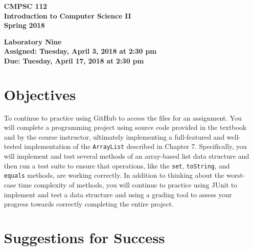 \documentclass[11pt]{article}
\newcommand{\assignmentduedate}{April 17}
\newcommand{\assignmentassignedate}{April 3}
\newcommand{\assignmentnumber}{Nine}
\newcommand{\labyear}{2018}
\newcommand{\labday}{Tuesday}
\newcommand{\labtime}{2:30 pm}
\newcommand{\assigneddate}{Assigned: \labday, \assignmentassignedate, \labyear{} at \labtime{}}
\newcommand{\duedate}{Due: \labday, \assignmentduedate, \labyear{} at \labtime{}}
\newcommand{\program}[1]{\lstinline{#1}}
\newcommand{\labtitle}[1]
{
  \begin{center}
    \begin{center}
      \bf
      CMPSC 112\\Introduction to Computer Science II\\
      Spring 2018\\
      \medskip
    \end{center}
    \bf
    #1
  \end{center}
}
\begin{document}
\thispagestyle{empty}

\labtitle{Laboratory \assignmentnumber{} \\ \assigneddate{} \\ \duedate{}}

\section*{Objectives}

To continue to practice using GitHub to access the files for an assignment. You
will complete a programming project using source code provided in the textbook
and by the course instructor, ultimately implementing a full-featured and
well-tested implementation of the \program{ArrayList} described in Chapter 7.
Specifically, you will implement and test several methods of an array-based list
data structure and then run a test suite to ensure that operations, like the
\program{set}, \program{toString}, and \program{equals} methods, are working
correctly. In addition to thinking about the worst-case time complexity of
methods, you will continue to practice using JUnit to implement and test a data
structure and using a grading tool to assess your progress towards correctly
completing the entire project.

\section*{Suggestions for Success}
\end{document}
